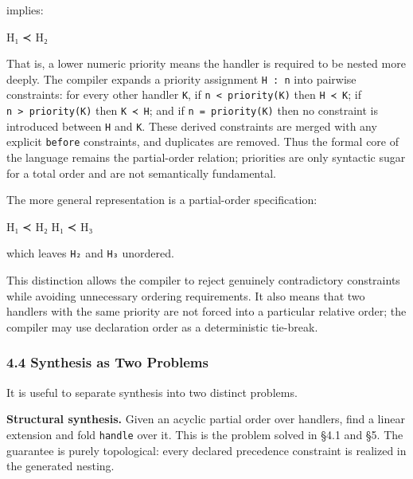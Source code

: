 \documentclass[
  11pt,
]{article}
\newenvironment{Shaded}{}{}
\newcommand{\NormalTok}[1]{#1}
\begin{document}
implies:

\begin{Shaded}
\begin{Highlighting}[]
\NormalTok{H₁ ≺ H₂}
\end{Highlighting}
\end{Shaded}

That is, a lower numeric priority means the handler is required to be
nested more deeply. The compiler expands a priority assignment
\texttt{H\ :\ n} into pairwise constraints: for every other handler
\texttt{K}, if \texttt{n\ \textless{}\ priority(K)} then
\texttt{H\ ≺\ K}; if \texttt{n\ \textgreater{}\ priority(K)} then
\texttt{K\ ≺\ H}; and if \texttt{n\ =\ priority(K)} then no constraint
is introduced between \texttt{H} and \texttt{K}. These derived
constraints are merged with any explicit \texttt{before} constraints,
and duplicates are removed. Thus the formal core of the language remains
the partial-order relation; priorities are only syntactic sugar for a
total order and are not semantically fundamental.

The more general representation is a partial-order specification:

\begin{Shaded}
\begin{Highlighting}[]
\NormalTok{H₁ ≺ H₂}
\NormalTok{H₁ ≺ H₃}
\end{Highlighting}
\end{Shaded}

which leaves \texttt{H₂} and \texttt{H₃} unordered.

This distinction allows the compiler to reject genuinely contradictory
constraints while avoiding unnecessary ordering requirements. It also
means that two handlers with the same priority are not forced into a
particular relative order; the compiler may use declaration order as a
deterministic tie-break.

\subsubsection{4.4 Synthesis as Two
Problems}\label{synthesis-as-two-problems}

It is useful to separate synthesis into two distinct problems.

\textbf{Structural synthesis.} Given an acyclic partial order over
handlers, find a linear extension and fold \texttt{handle} over it. This
is the problem solved in §4.1 and §5. The guarantee is purely
topological: every declared precedence constraint is realized in the
generated nesting.
\end{document}
